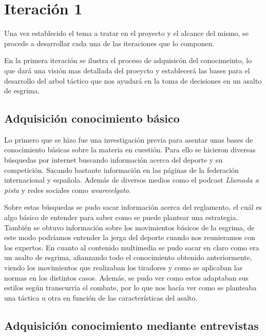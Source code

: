 \section{Iteración 1}

Una vez establecido el tema a tratar en el proyecto y el alcance del mismo,
se procede a desarrollar cada una de las iteraciones que lo componen.

En la primera iteración se ilustra el proceso de adquisicón del conocimeinto,
lo que dará una visión mas detallada del proeycto y establecerá las bases
para el desarrollo del arbol táctico que nos ayudará en la toma de decisiones en un asalto de esgrima.

\subsection{Adquisición conocimiento básico}

Lo primero que se hizo fue una investigación previa para asentar unas bases de conocimiento
básicas sobre la materia en cuestión. Para ello se hicieron diversas búsquedas por internet
buscando información acerca del deporte y su competición. Sacando bastante información
en las páginas de la federación internacional y española. Además de diversos medios como
el podcast \textit{Llamada a pista} y redes sociales como \textit{weareeelgato}.

Sobre estas búsquedas se pudo sacar información acerca del reglamento, el cuál es algo
básico de entender para saber como se puede plantear una estrategia. También se obtuvo
información sobre los movimientos básicos de la esgrima, de este modo podríamos entender
la jerga del deporte cuando nos reunieramos con los expertos. En cuanto al contenido
multimedia se pudo sacar en claro como era un asalto de esgrima, afianzando todo el conocimiento
obtenido anteriormente, viendo los movimientos que realizaban los tiradores y como
se aplicaban las normas en los distintos casos. Además, se pudo ver como estos adaptaban
sus estilos según transcurría el combate, por lo que nos hacía ver como se planteaba
una táctica u otra en función de las características del asalto.

\subsection{Adquisición conocimiento mediante entrevistas}

